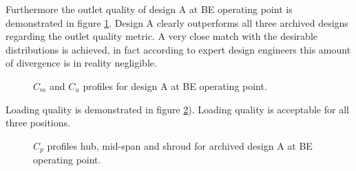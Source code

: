 Furthermore the outlet quality of design A at BE operating point is demonstrated in figure  \ref{Francis-A-OUT}. Design A clearly outperforms all three archived designs regarding the outlet quality metric. A very close match with the desirable distributions is achieved, in fact according to expert design engineers this amount of divergence is in reality negligible.

\begin{figure}[h!]
\begin{minipage}[b]{1\linewidth}
 \centering
\end{minipage}
\caption{$C_m$ and $C_u$ profiles for design A at BE operating point.}
\label{Francis-A-OUT}
\end{figure}

Loading quality is demonstrated in figure \ref{Francis-A-LOAD}). Loading quality is acceptable for all three positions. 

\begin{figure}[h!]
\begin{minipage}[b]{1\linewidth}
 \centering
\end{minipage}
\caption{$C_p$ profiles hub, mid-span and shroud for archived design A at BE operating point.}
\label{Francis-A-LOAD}
\end{figure} 

